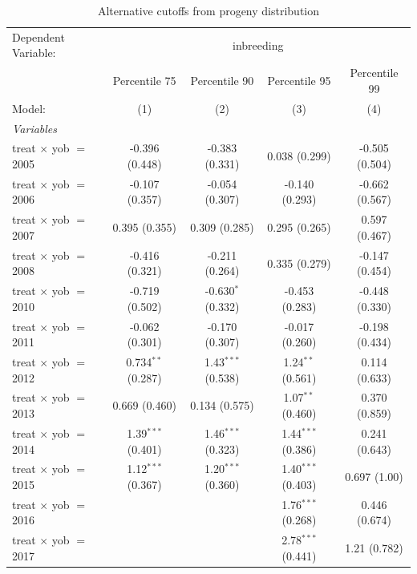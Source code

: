 
\begin{table}[htbp]
   \caption{\label{tab:table2} Alternative cutoffs from progeny distribution}
   \centering
   \begin{tabular}{lcccc}
      \tabularnewline \midrule \midrule
      Dependent Variable: & \multicolumn{4}{c}{inbreeding}\\
                                   & Percentile 75        & Percentile 90        & Percentile 95        & Percentile 99 \\   
      Model:                       & (1)                  & (2)                  & (3)                  & (4)\\  
      \midrule
      \emph{Variables}\\
      treat $\times$ yob $=$ 2005  & -0.396 (0.448)       & -0.383 (0.331)       & 0.038 (0.299)        & -0.505 (0.504)\\   
      treat $\times$ yob $=$ 2006  & -0.107 (0.357)       & -0.054 (0.307)       & -0.140 (0.293)       & -0.662 (0.567)\\   
      treat $\times$ yob $=$ 2007  & 0.395 (0.355)        & 0.309 (0.285)        & 0.295 (0.265)        & 0.597 (0.467)\\   
      treat $\times$ yob $=$ 2008  & -0.416 (0.321)       & -0.211 (0.264)       & 0.335 (0.279)        & -0.147 (0.454)\\   
      treat $\times$ yob $=$ 2010  & -0.719 (0.502)       & -0.630$^{*}$ (0.332) & -0.453 (0.283)       & -0.448 (0.330)\\   
      treat $\times$ yob $=$ 2011  & -0.062 (0.301)       & -0.170 (0.307)       & -0.017 (0.260)       & -0.198 (0.434)\\   
      treat $\times$ yob $=$ 2012  & 0.734$^{**}$ (0.287) & 1.43$^{***}$ (0.538) & 1.24$^{**}$ (0.561)  & 0.114 (0.633)\\   
      treat $\times$ yob $=$ 2013  & 0.669 (0.460)        & 0.134 (0.575)        & 1.07$^{**}$ (0.460)  & 0.370 (0.859)\\   
      treat $\times$ yob $=$ 2014  & 1.39$^{***}$ (0.401) & 1.46$^{***}$ (0.323) & 1.44$^{***}$ (0.386) & 0.241 (0.643)\\   
      treat $\times$ yob $=$ 2015  & 1.12$^{***}$ (0.367) & 1.20$^{***}$ (0.360) & 1.40$^{***}$ (0.403) & 0.697 (1.00)\\   
      treat $\times$ yob $=$ 2016  &                      &                      & 1.76$^{***}$ (0.268) & 0.446 (0.674)\\   
      treat $\times$ yob $=$ 2017  &                      &                      & 2.78$^{***}$ (0.441) & 1.21 (0.782)\\   

\end{tabular}
\end{table}
